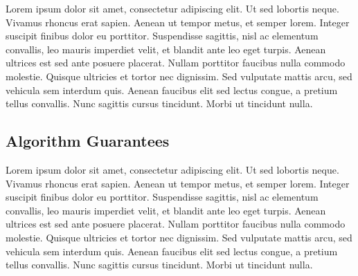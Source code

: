  Lorem ipsum dolor sit amet, consectetur adipiscing elit. Ut sed lobortis neque. Vivamus rhoncus erat sapien. Aenean ut tempor metus, et semper lorem. Integer suscipit finibus dolor eu porttitor. Suspendisse sagittis, nisl ac elementum convallis, leo mauris imperdiet velit, et blandit ante leo eget turpis. Aenean ultrices est sed ante posuere placerat. Nullam porttitor faucibus nulla commodo molestie. Quisque ultricies et tortor nec dignissim. Sed vulputate mattis arcu, sed vehicula sem interdum quis. Aenean faucibus elit sed lectus congue, a pretium tellus convallis. Nunc sagittis cursus tincidunt. Morbi ut tincidunt nulla.

\subsection{Algorithm Guarantees}
 Lorem ipsum dolor sit amet, consectetur adipiscing elit. Ut sed lobortis neque. Vivamus rhoncus erat sapien. Aenean ut tempor metus, et semper lorem. Integer suscipit finibus dolor eu porttitor. Suspendisse sagittis, nisl ac elementum convallis, leo mauris imperdiet velit, et blandit ante leo eget turpis. Aenean ultrices est sed ante posuere placerat. Nullam porttitor faucibus nulla commodo molestie. Quisque ultricies et tortor nec dignissim. Sed vulputate mattis arcu, sed vehicula sem interdum quis. Aenean faucibus elit sed lectus congue, a pretium tellus convallis. Nunc sagittis cursus tincidunt. Morbi ut tincidunt nulla.

